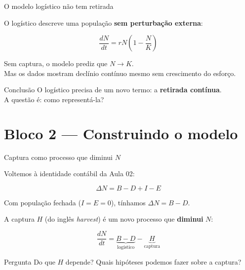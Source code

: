 \documentclass[12pt]{beamer}
\begin{document}
\begin{frame}{O modelo logístico não tem retirada}

  O logístico descreve uma população \textbf{sem perturbação externa}:

  \[
    \frac{dN}{dt} = rN\!\left(1 - \frac{N}{K}\right)
  \]

  \bigskip
  Sem captura, o modelo prediz que $N \to K$.\\
  Mas os dados mostram declínio contínuo mesmo sem crescimento do esforço.

  \bigskip
  \begin{exampleblock}{Conclusão}
    O logístico precisa de um novo termo: a \textbf{retirada contínua}.\\
    A questão é: como representá-la?
  \end{exampleblock}

\end{frame}

\section{Bloco 2 — Construindo o modelo}

\begin{frame}{Captura como processo que diminui $N$}

  Voltemos à identidade contábil da Aula 02:

  \[
    \Delta N = B - D + I - E
  \]

  \bigskip
  Com população fechada ($I = E = 0$), tínhamos $\Delta N = B - D$.

  \bigskip
  A captura $H$ (do inglês \emph{harvest}) é um novo processo
  que \textbf{diminui} $N$:

  \[
    \frac{dN}{dt} = \underbrace{B - D}_{\text{logístico}} - \underbrace{H}_{\text{captura}}
  \]

  \bigskip
  \begin{alertblock}{Pergunta}
    Do que $H$ depende?
    Quais hipóteses podemos fazer sobre a captura?
  \end{alertblock}

\end{frame}
\end{document}
